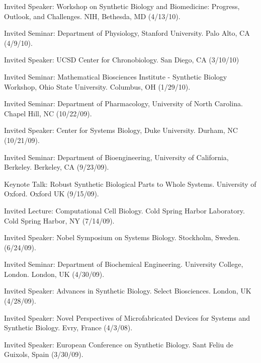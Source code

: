 \item Invited Speaker: Workshop on Synthetic Biology and Biomedicine:  Progress, Outlook, and Challenges.  NIH, Bethesda, MD (4/13/10).

\item Invited Seminar: Department of Physiology, Stanford University.  Palo Alto, CA (4/9/10).

\item Invited Speaker: UCSD Center for Chronobiology. San Diego, CA (3/10/10)

\item Invited Seminar: Mathematical Biosciences Institute - Synthetic Biology Workshop, Ohio State University.  Columbus, OH (1/29/10).  

\item Invited Seminar: Department of Pharmacology, University of North Carolina.  Chapel Hill, NC (10/22/09). 

\item Invited Speaker: Center for Systems Biology, Duke University.  Durham, NC (10/21/09).

\item Invited Seminar: Department of Bioengineering, University of California, Berkeley.  Berkeley, CA (9/23/09).  

\item Keynote Talk: Robust Synthetic Biological Parts to Whole Systems.  University of Oxford. Oxford UK (9/15/09).  

\item Invited Lecture: Computational Cell Biology. Cold Spring Harbor Laboratory.  Cold Spring Harbor, NY (7/14/09).

\item Invited Speaker: Nobel Symposium on Systems Biology.  Stockholm, Sweden. (6/24/09).

\item Invited Seminar: Department of Biochemical Engineering.  University College, London.  London, UK (4/30/09).

\item Invited Speaker: Advances in Synthetic Biology.  Select Biosciences.  London, UK (4/28/09). 

\item Invited Speaker: Novel Perspectives of Microfabricated Devices for Systems and Synthetic Biology.  Evry, France (4/3/08).

\item Invited Speaker: European Conference on Synthetic Biology. Sant Feliu de Guixols, Spain (3/30/09).

